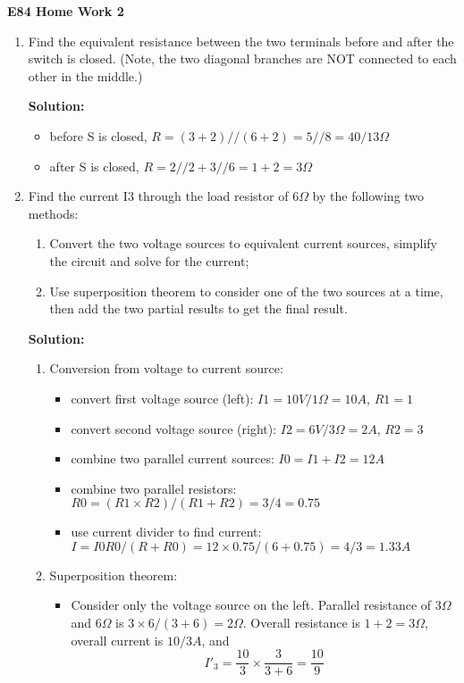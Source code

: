 \usepackage{html}

\begin{center}
{\Large \bf E84 Home Work 2}
\end{center}
\begin{enumerate}

\item Find the equivalent resistance between the two terminals before and
after the switch is closed. (Note, the two diagonal branches are NOT
connected to each other in the middle.)


{\bf Solution:}
\begin{itemize}
\item before S is closed, $R=(3+2)//(6+2)=5//8=40/13 \Omega$
\item after S is closed, $R=2//2+3//6=1+2=3 \Omega$
\end{itemize}

\item Find the current I3 through the load resistor of 6$\Omega$ by the
following two methods:
\begin{enumerate}
\item Convert the two voltage sources to equivalent current sources, 
	simplify the circuit and solve for the current;
\item Use superposition theorem to consider one of the two sources at a
	time, then add the two partial results to get the final result.
\end{enumerate}


{\bf Solution:}
\begin{enumerate}
\item Conversion from voltage to current source:
\begin{itemize}
\item convert first voltage source (left):   $I1=10V/1\Omega=10A$, $R1=1$
\item convert second voltage source (right): $I2=6V/3\Omega=2A$, $R2=3$
\item combine two parallel current sources: $I0=I1+I2=12A$
\item combine two parallel resistors: $R0=(R1\times R2)/(R1+R2)=3/4=0.75$
\item use current divider to find current:
       $I=I0 R0/(R+R0)=12\times 0.75/(6+0.75)=4/3=1.33A$
\end{itemize}
\item Superposition theorem:
\begin{itemize}
\item Consider only the voltage source on the left. Parallel resistance
of $3\Omega$ and $6\Omega$ is $3\times 6/(3+6)=2\Omega$. Overall resistance
is $1+2=3\Omega$, overall current is $10/3A$, and
\[	I'_3=\frac{10}{3}\times \frac{3}{3+6}=\frac{10}{9} \]


\end{itemize}
\end{enumerate}
\end{enumerate}
